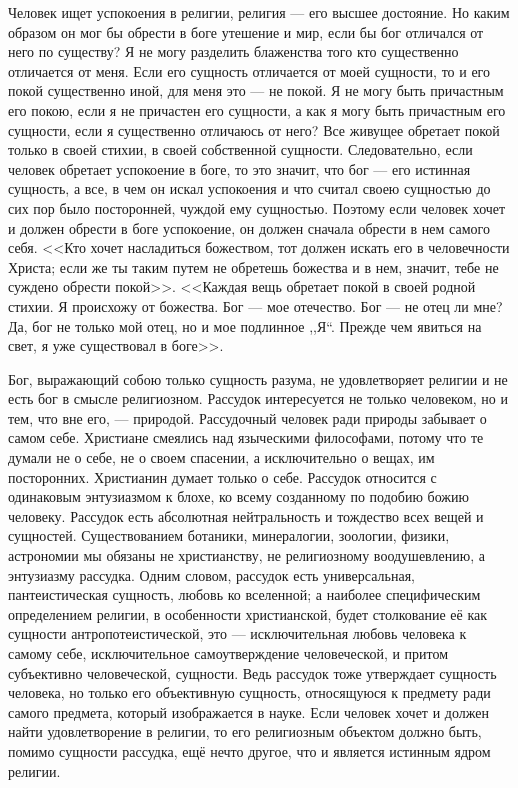 \documentclass[12pt,oneside]{book}
\newcommand{\rom}[1]{\uppercase\expandafter{\romannumeral #1\relax}}
\begin{document}
Человек ищет успокоения в религии, религия --- его высшее достояние. Но каким образом он мог бы обрести в боге утешение и мир, если бы бог отличался от него по существу? Я не могу разделить блаженства того кто существенно отличается от меня. Если его сущность отличается от моей сущности, то и его покой существенно иной, для меня это --- не покой. Я не могу быть причастным его покою, если я не причастен его сущности, а как я могу быть причастным его сущности, если я существенно отличаюсь от него? Все живущее обретает покой только в своей стихии, в своей собственной сущности. Следовательно, если человек обретает успокоение в боге, то это значит, что бог --- его истинная сущность, а все, в чем он искал успокоения и что считал своею сущностью до сих пор было посторонней, чуждой ему сущностью. Поэтому если человек хочет и должен обрести в боге успокоение, он должен сначала обрести в нем самого себя. <<Кто хочет насладиться божеством, тот должен искать его в человечности Христа; если же ты таким путем не обретешь божества и в нем, значит, тебе не суждено обрести покой>>\dag\let\svthefootnote\thefootnote\let\thefootnote\relax\footnotetext{\dagЛютер, ч. \rom{3}, стр. 589.}\let\thefootnote\svthefootnote. <<Каждая вещь обретает покой в своей родной стихии. Я происхожу от божества. Бог --- мое отечество. Бог --- не отец ли мне? Да, бог не только мой отец, но и мое подлинное ,,Я``. Прежде чем явиться на свет, я уже существовал в боге>>\ddag\let\svthefootnote\thefootnote\let\thefootnote\relax{}\let\thefootnote\svthefootnote.




Бог, выражающий собою только сущность разума, не удовлетворяет религии и не есть бог в смысле религиозном. Рассудок интересуется не только человеком, но и тем, что вне его, --- природой. Рассудочный человек ради природы забывает о самом себе. Христиане смеялись над языческими философами, потому что те думали не о себе, не о своем спасении, а исключительно о вещах, им посторонних. Христианин думает только о себе. Рассудок относится с одинаковым энтузиазмом к блохе, ко всему созданному по подобию божию человеку. Рассудок есть абсолютная нейтральность и тождество всех вещей и сущностей. Существованием ботаники, минералогии, зоологии, физики, астрономии мы обязаны не христианству, не религиозному воодушевлению, а энтузиазму рассудка. Одним словом, рассудок есть универсальная, пантеистическая сущность, любовь ко вселенной; а наиболее специфическим определением религии, в особенности христианской, будет столкование её как сущности антропотеистической, это --- исключительная любовь человека к самому себе, исключительное самоутверждение человеческой, и притом субъективно человеческой, сущности. Ведь рассудок тоже утверждает сущность человека, но только его объективную сущность, относящуюся к предмету ради самого предмета, который изображается в науке. Если человек хочет и должен найти удовлетворение в религии, то его религиозным объектом должно быть, помимо сущности рассудка, ещё нечто другое, что и является истинным ядром религии.
\end{document}
